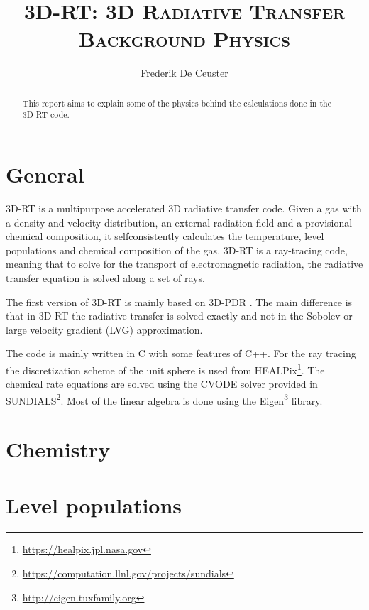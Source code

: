 \documentclass[]{article}
\title{\vspace{0cm} \huge \textsc{3D-RT: 3D Radiative Transfer} \\
                \vskip3mm \textsc{ Background Physics} }
\author{\large Frederik De Ceuster}
\date{}
\begin{document}
\maketitle

\vskip5cm

\begin{abstract}
This report aims to explain some of the physics behind the calculations done in the 3D-RT code.
\end{abstract}

\vskip5cm

\tableofcontents

\newpage


\section{General}

3D-RT is a multipurpose accelerated 3D radiative transfer code. Given a gas with a density and velocity distribution, an external radiation field and a provisional chemical composition, it selfconsistently calculates the temperature, level populations and chemical composition of the gas. 3D-RT is a ray-tracing code, meaning that to solve for the transport of electromagnetic radiation, the radiative transfer equation is solved along a set of rays.

\bigskip

The first version of 3D-RT is mainly based on 3D-PDR \cite{3DPDR}. The main difference is that in 3D-RT the radiative transfer is solved exactly and not in the Sobolev or large velocity gradient (LVG) approximation.

\bigskip

The code is mainly written in C with some features of C++. For the ray tracing the discretization scheme of the unit sphere is used from HEALPix\footnote{\url{https://healpix.jpl.nasa.gov}}. The chemical rate equations are solved using the CVODE solver provided in SUNDIALS\footnote{\url{https://computation.llnl.gov/projects/sundials}}. Most of the linear algebra is done using the Eigen\footnote{\url{http://eigen.tuxfamily.org}} library.



\section{Chemistry}



\section{Level populations}
\end{document}
